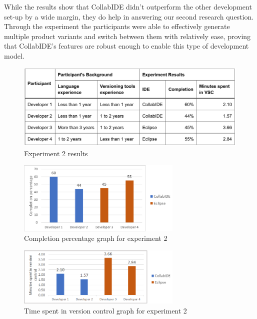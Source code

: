 While the results show that CollabIDE didn't outperform the other development set-up by a wide margin, they do help in answering our second research question. Through the experiment the participants were able to effectively generate multiple product variants and switch between them with relatively ease, proving that CollabIDE's features are robust enough to enable this type of development model.

\begin{figure}[htbp]
  \centering
  \includegraphics[width=1\textwidth]{img/resultsTableProductLine}
  \caption{Experiment 2 results}
  \label{fig:resultsTableProductLine}
\end{figure}

\begin{figure}[htbp]
  \centering
  \includegraphics[width=0.7\textwidth]{img/completionProductLine}
  \caption{Completion percentage graph for experiment 2}
  \label{fig:completionProductLine}
\end{figure}

\begin{figure}[htbp]
  \centering
  \includegraphics[width=0.7\textwidth]{img/versionControlProductLine}
  \caption{Time spent in version control graph for experiment 2}
  \label{fig:versionControlProductLine}
\end{figure}

